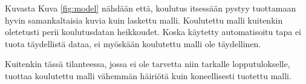 Kuvasta Kuva \ref{fig:model}  nähdään että, koulutus itsessään pystyy tuottamaan hyvin samankaltaisia kuvia kuin laskettu malli. Koulutettu malli kuitenkin oletetusti perii koulutusdatan heikkoudet. Koska käytetty automatisoitu tapa ei tuota täydellistä dataa, ei myöskään koulutettu malli ole täydellinen. 

Kuitenkin tässä tilanteessa, jossa ei ole tarvetta niin tarkalle lopputulokselle, tuottaa koulutettu malli vähemmän häiriötä kuin koneellisesti tuotettu malli. 